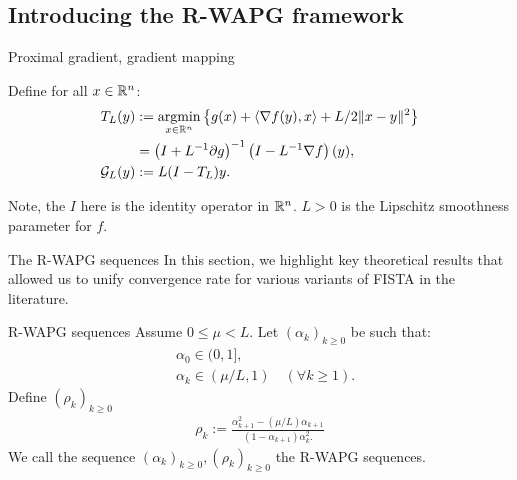 \documentclass[11pt]{beamer}
\theoremstyle{definition}
\begin{document}
    \subsection{Introducing the R-WAPG framework}
        \begin{frame}{Proximal gradient, gradient mapping}
            \begin{definition}
                Define for all $x\in \mathbb R^n$: 
                \begin{align*}
                    T_L(y) 
                    &:= \mathop{\rm argmin}\limits_{x \in \mathbb R^n} \left\lbrace
                        g(x) + \langle \nabla f(y), x\rangle + L/2\Vert x - y\Vert^2
                    \right\rbrace 
                    \\
                    &= \left(I + L^{-1}\partial g\right)^{-1}
                    \left(I - L^{-1}\nabla f\right)(y),
                    \\
                    \mathcal G_L(y)
                    &:= L(I - T_L)y.
                \end{align*}
            \end{definition}
            Note, the $I$ here is the identity operator in $\mathbb R^n$. 
            $L > 0$ is the Lipschitz smoothness parameter for $f$. 
        \end{frame}
        \begin{frame}{The R-WAPG sequences}
            In this section, we highlight key theoretical results that allowed us to unify convergence rate for various variants of FISTA in the literature.
            \begin{definition}{R-WAPG sequences}\label{def:rwapg-seq}
                Assume $0 \le \mu < L$. 
                Let $(\alpha_k)_{k \ge 0}$ be such that: 
                \begin{align*}
                    & \alpha_0 \in (0, 1], \\
                    & \alpha_k \in (\mu/L, 1) \quad (\forall k \ge 1). 
                \end{align*}    
                Define $(\rho_k)_{k \ge 0}$
                \begin{align*}
                    \rho_k := \frac{\alpha_{k + 1}^2 - (\mu/L) \alpha_{k + 1}}{
                        (1 - \alpha_{k + 1}) \alpha_k^2.
                    }
                \end{align*}
                We call the sequence $(\alpha_k)_{k \ge 0}, (\rho_k)_{k \ge0}$ the R-WAPG sequences. 
            \end{definition}
        \end{frame}
\end{document}
